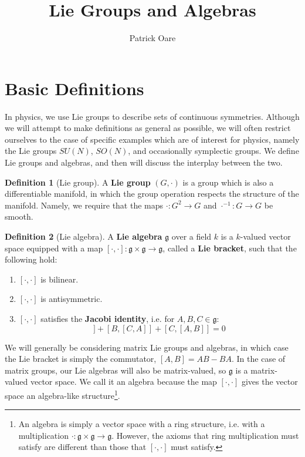 \documentclass[11pt, oneside]{article}   	%
\title{Lie Groups and Algebras}
\author{Patrick Oare}
\date{}							%
\theoremstyle{definition}
\newtheorem{definition}{Definition}[section]
\begin{document}
\maketitle

\section{Basic Definitions}

In physics, we use Lie groups to describe sets of continuous symmetries. Although we will attempt to 
make definitions as general as possible, we will often restrict ourselves to the case of specific 
examples which are of interest for physics, namely the Lie groups $SU(N)$, $SO(N)$, and 
occasionally symplectic groups. We define Lie groups and algebras, and then will discuss the 
interplay between the two.

\begin{definition}[Lie group]
	A \textbf{Lie group} $(G, \cdot)$ is a group which is also a differentiable manifold, in which the 
	group operation respects the structure of the manifold. Namely, we require that the maps 
	$\cdot : G^2\rightarrow G$ and $\cdot^{-1} : G\rightarrow G$ be smooth.
\end{definition}

\begin{definition}[Lie algebra]
	A \textbf{Lie algebra} $\mathfrak g$ over a field $k$ is a $k$-valued vector space equipped with 
	a map $[\cdot, \cdot] : \mathfrak g\times\mathfrak g\rightarrow\mathfrak g$, called a \textbf{Lie 
	bracket}, such that the following hold:
	\begin{enumerate}
		\item $[\cdot, \cdot]$ is bilinear.
		\item $[\cdot, \cdot]$ is antisymmetric. 
		\item $[\cdot, \cdot]$ satisfies the \textbf{Jacobi identity}, i.e. for $A, B, C\in\mathfrak g$:
		\begin{equation}
			[A, [B, C]] + [B, [C, A]] + [C, [A, B]] = 0
		\end{equation}
	\end{enumerate}
\end{definition}

We will generally be considering matrix Lie groups and algebras, in which case the Lie bracket is 
simply the commutator, $[A, B] = AB - BA$. In the case of matrix groups, our Lie algebras will 
also be matrix-valued, so $\mathfrak g$ is a matrix-valued vector space. We call it an algebra 
because the map $[\cdot, \cdot]$ gives the vector space an algebra-like structure\footnote{An 
algebra is simply a vector space with a ring structure, i.e. with a multiplication $\cdot : \mathfrak 
g\times \mathfrak g \rightarrow\mathfrak g$. However, the axioms that ring multiplication must satisfy 
are different than those that $[\cdot, \cdot]$ must satisfy.}.
\end{document}
